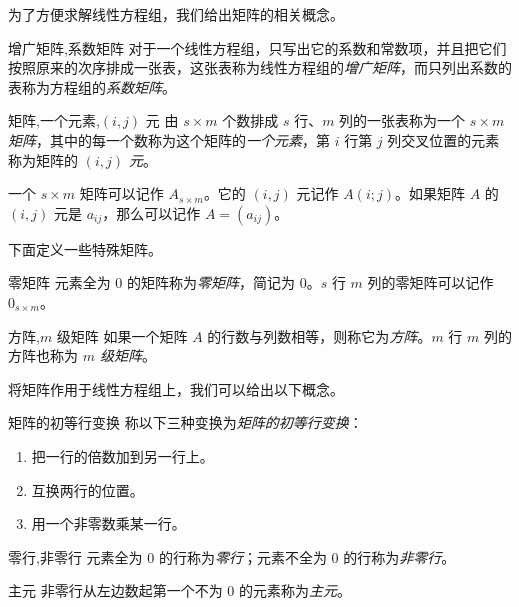 为了方便求解线性方程组，我们给出矩阵的相关概念。

\begin{definition}{增广矩阵,系数矩阵}
	对于一个线性方程组，只写出它的系数和常数项，并且把它们按照原来的次序排成一张表，这张表称为线性方程组的\emph{增广矩阵}，而只列出系数的表称为方程组的\emph{系数矩阵}。
\end{definition}

\begin{definition}{矩阵,一个元素,$(i, j)$ 元}
	由 $s \times m$ 个数排成 $s$ 行、$m$ 列的一张表称为一个 \emph{$s \times m$ 矩阵}，其中的每一个数称为这个矩阵的\emph{一个元素}，第 $i$ 行第 $j$ 列交叉位置的元素称为矩阵的 \emph{$(i, j)$ 元}。
\end{definition}

一个 $s \times m$ 矩阵可以记作 $A_{s \times m}$。它的 $(i, j)$ 元记作 $A(i; j)$。如果矩阵 $A$ 的 $(i, j)$ 元是 $a_{ij}$，那么可以记作 $A = (a_{ij})$。

下面定义一些特殊矩阵。

\begin{definition}{零矩阵}
	元素全为 $0$ 的矩阵称为\emph{零矩阵}，简记为 $0$。$s$ 行 $m$ 列的零矩阵可以记作 $0_{s \times m}$。
\end{definition}

\begin{definition}{方阵,$m$ 级矩阵}
	如果一个矩阵 $A$ 的行数与列数相等，则称它为\emph{方阵}。$m$ 行 $m$ 列的方阵也称为 \emph{$m$ 级矩阵}。
\end{definition}

将矩阵作用于线性方程组上，我们可以给出以下概念。

\begin{definition}{矩阵的初等行变换}
	称以下三种变换为\emph{矩阵的初等行变换}：
	\begin{enumerate}
		\item 把一行的倍数加到另一行上。
		\item 互换两行的位置。
		\item 用一个非零数乘某一行。
	\end{enumerate}
\end{definition}

\begin{definition}{零行,非零行}
	元素全为 $0$ 的行称为\emph{零行}；元素不全为 $0$ 的行称为\emph{非零行}。
\end{definition}

\begin{definition}{主元}
	非零行从左边数起第一个不为 $0$ 的元素称为\emph{主元}。
\end{definition}

